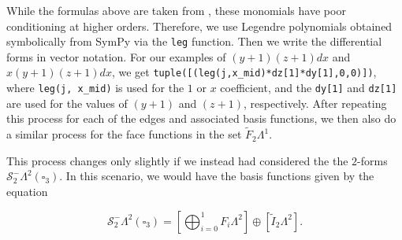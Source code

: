 \documentclass[format=acmsmall,screen,timestamp=false,a4paper]{acmart}
\newcommand{\calS}{\mathcal{S}}
\begin{document}
While the formulas above are taken from \citet{gillette2019computational}, these monomials have poor conditioning at higher orders.
Therefore, we use Legendre polynomials obtained symbolically from SymPy via the \texttt{leg} function.  Then we write the differential forms in vector notation.  For our examples of $(y+1)(z+1)dx$ and $x(y+1)(z+1)dx$, we get
\texttt{tuple([(leg(j,x\_mid)*dz[1]*dy[1],0,0)])}, where \texttt{leg(j, x\_mid)} is used for the $1$ or $x$ coefficient, and the \texttt{dy[1]} and \texttt{dz[1]} are used for the values of $(y+1)$ and $(z+1)$, respectively.  After repeating this process for each of the edges and associated basis functions, we then also do a similar process for the face functions in the set $\tilde{F}_2 \Lambda^1$.  

This process changes only slightly if we instead had considered the the $2$-forms $\mathcal{S}^-_2 \Lambda^2(\square_3)$.  In this scenario, we would have the basis functions given by the equation

\begin{equation*}
\calS^-_2\Lambda^2(\square_3) =    \left[\bigoplus_{i=0}^{1} F_i \Lambda^2\right] \oplus \left[\tilde{I}_2 \Lambda^2\right].
\end{equation*}
\end{document}
